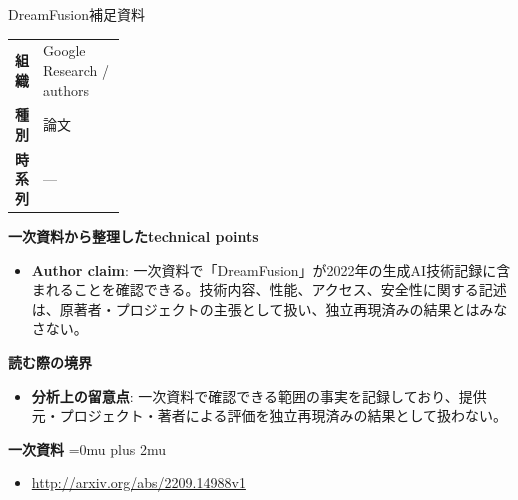 \begin{technicalnote}{DreamFusion}{補足資料}
\begingroup
\begin{tabularx}{\linewidth}{@{}>{\bfseries}p{0.22\linewidth}X@{}}
組織 & Google Research / authors \\
種別 & 論文 \\
時系列 & — \\
\end{tabularx}
\smallskip
{\bfseries 一次資料から整理したtechnical points}
\begin{itemize}[leftmargin=1.5em,itemsep=0.35em]
\item \textbf{Author claim}: 一次資料で「DreamFusion」が2022年の生成AI技術記録に含まれることを確認できる。技術内容、性能、アクセス、安全性に関する記述は、原著者・プロジェクトの主張として扱い、独立再現済みの結果とはみなさない。
\end{itemize}
\begin{minipage}{\linewidth}
{\bfseries 読む際の境界}
\begin{itemize}[leftmargin=1.5em,itemsep=0.35em]
\item \textbf{分析上の留意点}: 一次資料で確認できる範囲の事実を記録しており、提供元・プロジェクト・著者による評価を独立再現済みの結果として扱わない。
\end{itemize}
\begin{samepage}
{\bfseries 一次資料}
\begingroup\sloppy
\Urlmuskip=0mu plus 2mu\relax
\begin{itemize}[leftmargin=1.5em,itemsep=0.25em]
\item {\scriptsize\url{http://arxiv.org/abs/2209.14988v1}}
\end{itemize}
\endgroup
\end{samepage}
\end{minipage}
\endgroup
\end{technicalnote}
\medskip
